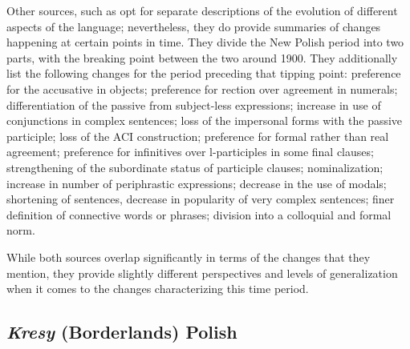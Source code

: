 Other sources, such as \citet{długosz-kurczabowa_dubisz_2006} opt for separate descriptions of the evolution of different aspects of the language; nevertheless, they do provide summaries of changes happening at certain points in time. They divide the New Polish period into two parts, with the breaking point between the two around 1900. They additionally list the following changes for the period preceding that tipping point: preference for the accusative in objects; preference for rection over agreement in numerals; differentiation of the passive from subject-less expressions; increase in use of conjunctions in complex sentences; loss of the impersonal forms with the passive participle; loss of the ACI construction; preference for formal rather than real agreement; preference for infinitives over l-participles in some final clauses; strengthening of the subordinate status of participle clauses; nominalization; increase in number of periphrastic expressions; decrease in the use of modals; shortening of sentences, decrease in popularity of very complex sentences; finer definition of connective words or phrases; division into a colloquial and formal norm. 

While both sources overlap significantly in terms of the changes that they mention, they provide slightly different perspectives and levels of generalization when it comes to the changes characterizing this time period.


\subsection{\textit{Kresy} (Borderlands) Polish}
\label{subsec:history-kresy}

